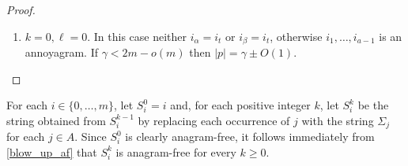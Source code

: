 \documentclass[kpfonts]{patmorin}
\begin{document}
\begin{proof}
    \begin{enumerate}
        \item $k=0,\ell=0$. In this case neither $i_\alpha=i_t$ or $i_\beta=i_t$, otherwise $i_1,\ldots,i_{a-1}$ is an annoyagram.  If $\gamma < 2m-o(m)$ then $|p|=\gamma\pm O(1)$.
    \end{enumerate}
\end{proof}






%
%
%
%

For each $i\in\{0,\ldots,m\}$, let $S_i^0=i$ and, for each positive integer $k$, let $S_i^k$ be the string obtained from $S_i^{k-1}$ by replacing each occurrence of $j$ with the string $\Sigma_j$ for each $j\in A$.  Since $S_i^0$ is clearly anagram-free, it follows immediately from \cref{blow_up_af} that $S_i^k$ is anagram-free for every $k\ge 0$.




\end{document}

